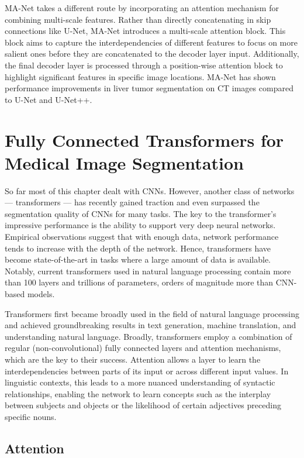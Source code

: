 MA-Net \cite{manet} takes a different route by incorporating an attention mechanism for combining multi-scale features. Rather than directly concatenating in skip connections like U-Net, MA-Net introduces a multi-scale attention block. This block aims to capture the interdependencies of different features to focus on more salient ones before they are concatenated to the decoder layer input. Additionally, the final decoder layer is processed through a position-wise attention block to highlight significant features in specific image locations. MA-Net has shown performance improvements in liver tumor segmentation on CT images compared to U-Net and U-Net++.

\section{Fully Connected Transformers for Medical Image Segmentation}

So far most of this chapter dealt with CNNs. However, another class of networks --- transformers \cite{attnAllYouNeed} --- has recently gained traction and even surpassed the segmentation quality of CNNs for many tasks. The key to the transformer's impressive performance is the ability to support very deep neural networks. Empirical observations suggest that with enough data, network performance tends to increase with the depth of the network. Hence, transformers have become state-of-the-art in tasks where a large amount of data is available. Notably, current transformers used in natural language processing contain more than 100 layers and trillions of parameters, orders of magnitude more than CNN-based models.

Transformers first became broadly used in the field of natural language processing and achieved groundbreaking results in text generation, machine translation, and understanding natural language. Broadly, transformers employ a combination of regular (non-convolutional) fully connected layers and attention mechanisms, which are the key to their success. Attention allows a layer to learn the interdependencies between parts of its input or across different input values. In linguistic contexts, this leads to a more nuanced understanding of syntactic relationships, enabling the network to learn concepts such as the interplay between subjects and objects or the likelihood of certain adjectives preceding specific nouns.

\subsection{Attention}

